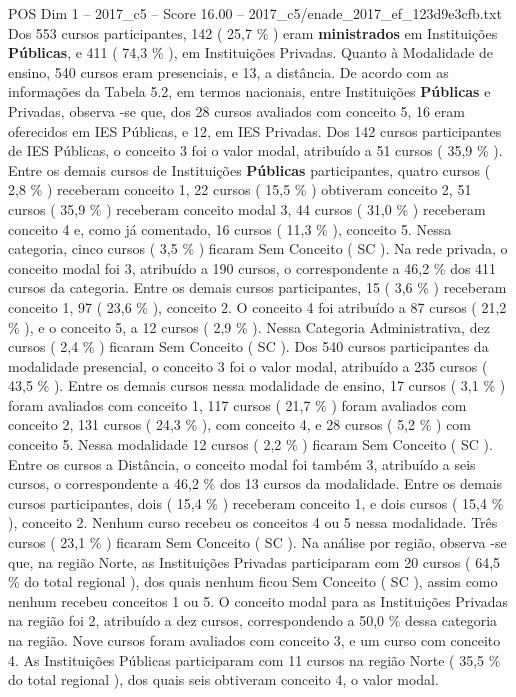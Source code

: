 \begin{textsample}{POS Dim 1 – 2017\_c5 – Score 16.00 – 2017\_c5/enade\_2017\_ef\_123d9e3cfb.txt}
Dos 553 cursos participantes, 142 ( 25,7 \% ) eram \textbf{ministrados} em Instituições \textbf{Públicas}, e 411 ( 74,3 \% ), em Instituições Privadas.
Quanto à Modalidade de ensino, 540 cursos eram presenciais, e 13, a distância.
De acordo com as informações da Tabela 5.2, em termos nacionais, entre Instituições \textbf{Públicas} e Privadas, observa -se que, dos 28 cursos avaliados com conceito 5, 16 eram oferecidos em IES Públicas, e 12, em IES Privadas.
Dos 142 cursos participantes de IES Públicas, o conceito 3 foi o valor modal, atribuído a 51 cursos ( 35,9 \% ).
Entre os demais cursos de Instituições \textbf{Públicas} participantes, quatro cursos ( 2,8 \% ) receberam conceito 1, 22 cursos ( 15,5 \% ) obtiveram conceito 2, 51 cursos ( 35,9 \% ) receberam conceito modal 3, 44 cursos ( 31,0 \% ) receberam conceito 4 e, como já comentado, 16 cursos ( 11,3 \% ), conceito 5.
Nessa categoria, cinco cursos ( 3,5 \% ) ficaram Sem Conceito ( SC ).
Na rede privada, o conceito modal foi 3, atribuído a 190 cursos, o correspondente a 46,2 \% dos 411 cursos da categoria.
Entre os demais cursos participantes, 15 ( 3,6 \% ) receberam conceito 1, 97 ( 23,6 \% ), conceito 2.
O conceito 4 foi atribuído a 87 cursos ( 21,2 \% ), e o conceito 5, a 12 cursos ( 2,9 \% ).
Nessa Categoria Administrativa, dez cursos ( 2,4 \% ) ficaram Sem Conceito ( SC ).
Dos 540 cursos participantes da modalidade presencial, o conceito 3 foi o valor modal, atribuído a 235 cursos ( 43,5 \% ).
Entre os demais cursos nessa modalidade de ensino, 17 cursos ( 3,1 \% ) foram avaliados com conceito 1, 117 cursos ( 21,7 \% ) foram avaliados com conceito 2, 131 cursos ( 24,3 \% ), com conceito 4, e 28 cursos ( 5,2 \% ) com conceito 5.
Nessa modalidade 12 cursos ( 2,2 \% ) ficaram Sem Conceito ( SC ).
Entre os cursos a Distância, o conceito modal foi também 3, atribuído a seis cursos, o correspondente a 46,2 \% dos 13 cursos da modalidade.
Entre os demais cursos participantes, dois ( 15,4 \% ) receberam conceito 1, e dois cursos ( 15,4 \% ), conceito 2.
Nenhum curso recebeu os conceitos 4 ou 5 nessa modalidade.
Três cursos ( 23,1 \% ) ficaram Sem Conceito ( SC ).
Na análise por região, observa -se que, na região Norte, as Instituições Privadas participaram com 20 cursos ( 64,5 \% do total regional ), dos quais nenhum ficou Sem Conceito ( SC ), assim como nenhum recebeu conceitos 1 ou 5.
O conceito modal para as Instituições Privadas na região foi 2, atribuído a dez cursos, correspondendo a 50,0 \% dessa categoria na região.
Nove cursos foram avaliados com conceito 3, e um curso com conceito 4.
As Instituições Públicas participaram com 11 cursos na região Norte ( 35,5 \% do total regional ), dos quais seis obtiveram conceito 4, o valor modal.

\end{textsample}
